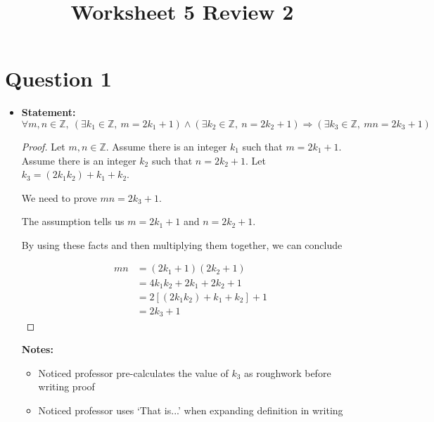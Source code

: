 \documentclass[12pt]{article}
\begin{document}
\title{Worksheet 5 Review 2}
\maketitle

\section*{Question 1}
\begin{itemize}

    \item

    \textbf{Statement:} $\forall m,n \in \mathbb{Z},\:(\exists k_1 \in \mathbb{Z},\:m=2k_1+1)
    \land (\exists k_2 \in \mathbb{Z},\:n = 2k_2 + 1) \Rightarrow (\exists k_3 \in \mathbb{Z},\:mn = 2k_3 + 1)$

    \begin{proof}

    Let $m,n \in \mathbb{Z}$. Assume there is an integer $k_1$ such that $m = 2k_1 + 1$.
    Assume there is an integer $k_2$ such that $n = 2k_2 + 1$. Let $k_3 = (2k_1k_2) + k_1 + k_2$.

    \bigskip

    We need to prove $mn = 2k_3 + 1$.

    \bigskip

    The assumption tells us $m = 2k_1 + 1$ and $n = 2k_2 + 1$.

    \bigskip

    By using these facts and then multiplying them together, we can conclude

    \begin{align}
        mn &= (2k_1 + 1)(2k_2 + 1)\\
        &= 4k_1k_2 + 2k_1 + 2k_2 + 1\\
        &= 2[(2k_1k_2) + k_1 + k_2] + 1\\
        &= 2k_3 + 1
    \end{align}

    \end{proof}

    \bigskip

    \textbf{Notes:}

    \begin{itemize}
        \item Noticed professor pre-calculates the value of $k_3$ as roughwork
        before writing proof
        \item Noticed professor uses `That is...' when expanding definition in writing


\end{itemize}
\end{itemize}
\end{document}
